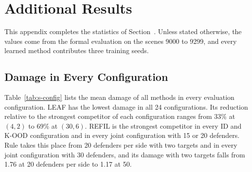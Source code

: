 \section{Additional Results}
\label{sec:s-results}
This appendix completes the statistics of Section~. Unless stated otherwise, the values come from the formal evaluation on the scenes 9000 to 9299, and every learned method contributes three training seeds.

\subsection{Damage in Every Configuration}
Table~\ref{tab:s-config} lists the mean damage of all methods in every evaluation configuration. LEAF has the lowest damage in all 24 configurations. Its reduction relative to the strongest competitor of each configuration ranges from 33\% at $(4,2)$ to 69\% at $(30,6)$. REFIL is the strongest competitor in every ID and K-OOD configuration and in every joint configuration with 15 or 20 defenders. Rule takes this place from 20 defenders per side with two targets and in every joint configuration with 30 defenders, and its damage with two targets falls from 1.76 at 20 defenders per side to 1.17 at 50.

